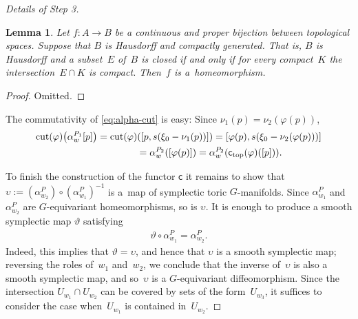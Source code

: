 \documentclass[10pt,a4paper]{amsart}
\numberwithin{equation}{section}
\newtheorem{Lemma}{Lemma}[section]
\begin{document}
\begin{proof}[Details of Step 3]
\begin{Lemma} \label{compactly generated}
Let $f \colon A \to B$ be a continuous and proper bijection
between topological spaces.  Suppose that $B$ is Hausdorff
and compactly generated.  That is, $B$ is Hausdorff and a subset~$E$ of~$B$ is closed if and only if for every compact~$K$
the intersection~$E \cap K$ is compact.
Then~$f$ is a~homeomorphism.
\end{Lemma}

\begin{proof}
Omitted.
\end{proof}

The commutativity of \eqref{eq:alpha-cut} is easy:
Since $\nu_1(p) = \nu_2(\varphi(p))$,
\begin{gather*}
  \operatorname{cut}(\varphi) \big(\alpha^{P_1}_w [p]\big) =  \operatorname{cut}(\varphi) ([p,s(\xi_0 - \nu_1(p))])
    =  [\varphi(p),s(\xi_0 - \nu_2(\varphi(p)))]\\
\hphantom{\operatorname{cut}(\varphi) \big(\alpha^{P_1}_w [p]\big)}{} = \alpha^{P_2}_w ([\varphi(p)])
  =    \alpha^{P_2}_w ({\textsf{c}_{\rm top}}(\varphi) ([p])).
\end{gather*}

To f\/inish the construction of the functor ${\textsf{c}}$ it remains to show
that $\upsilon:= (\alpha^P_{w_2 })\circ (\alpha^P_{w_1})^{-1}$ is a~map
of symplectic toric $G$-manifolds.
Since $\alpha^P_{w_1}$ and $\alpha^P_{w_2}$
are $G$-equivariant homeomorphisms, so is $\upsilon$.
It is enough to produce a smooth symplectic map $\vartheta$ satisfying
\begin{gather*}%
\vartheta \circ \alpha^P_{w_1} = \alpha^P_{w_2}.
\end{gather*}
Indeed, this implies that $\vartheta = \upsilon$,
and hence that $\upsilon$ is a smooth symplectic map;
reversing the roles of~$w_1$ and~$w_2$, we conclude that the inverse
of~$\upsilon$ is also a smooth symplectic map,
and so~$\upsilon$ is a $G$-equivariant dif\/feomorphism.
Since the intersection $U_{w_1} \cap U_{w_2}$ can be covered by sets
of the form~$U_{w_3}$, it suf\/f\/ices to consider the case when~$U_{w_1}$
is contained in~$U_{w_2}$.


\end{proof}
\end{document}
